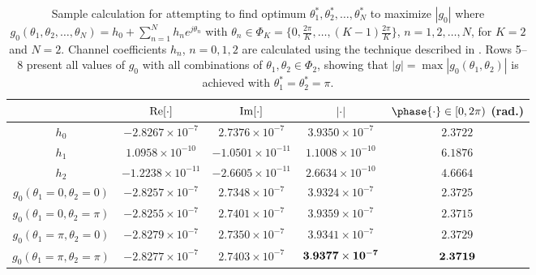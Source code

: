 \begin{table*}[!t]
\begin{center}
\begin{tabular}{|c|c|c|c|c|}
\hline
 &${\rm Re}[\cdot]$&${\rm Im}[\cdot]$&$| \cdot |$&$\phase{\cdot}\in [0, 2\pi )$ (rad.)\\
 \hline
 $h_0$& $-2.8267\times 10^{-7}$ & $2.7376\times 10^{-7}$ & $3.9350\times 10^{-7}$ & $2.3722$\\
 $h_1$& $1.0958\times 10^{-10}$ & $-1.0501\times 10^{-11}$ & $1.1008\times 10^{-10}$ & $6.1876$\\
 $h_2$& $-1.2238\times 10^{-11}$ & $-2.6605\times 10^{-11}$ & $2.6634\times 10^{-10}$ & $4.6664$\\
 \hline
 $g_0(\theta_1=0,\theta_2=0)$&$-2.8257\times 10^{-7}$&$2.7348\times 10^{-7}$&$3.9324\times 10^{-7}$&$2.3725$\\
 $g_0(\theta_1=0,\theta_2=\pi)$&$-2.8255\times 10^{-7}$&$2.7401\times 10^{-7}$&$3.9359\times 10^{-7}$&$2.3715$\\
 $g_0(\theta_1=\pi,\theta_2=0)$&$-2.8279\times 10^{-7}$&$2.7350\times 10^{-7}$&$3.9341\times 10^{-7}$&$2.3729$\\
 $g_0(\theta_1=\pi,\theta_2=\pi)$&$-2.8277\times 10^{-7}$&$2.7403\times 10^{-7}$&${\bf 3.9377}\times {\bf 10^{-7}}$&$\bf 2.3719$\\
 \hline
\end{tabular}
\caption{Sample calculation for attempting to find optimum $\theta_1^*, \theta_2^*,\ldots,\theta_N^*$ to maximize $|g_0|$ where $g_0 (\theta_1, \theta_2, \ldots, \theta_N) = h_0 + \sum_{n=1}^N h_n e^{j\theta_n}$ with $\theta_n\in\Phi_K = \{0,\frac{2\pi}{K},\ldots,(K-1)\frac{2\pi}{K}\}$, $n=1, 2, \ldots, N$, for $K=2$ and $N=2$. Channel coefficients $h_n$, $n=0,1,2$ are calculated using the technique described in \cite{b1}.
Rows 5--8 present all values of $g_0$ with all combinations of $\theta_1, \theta_2 \in \Phi_2$, showing that $|g| = \max |g_0 (\theta_1, \theta_2) |$ is achieved with $\theta_1^* =\theta_2^* = \pi$.
}
\label{tbl:compare}
\end{center}
\end{table*}
